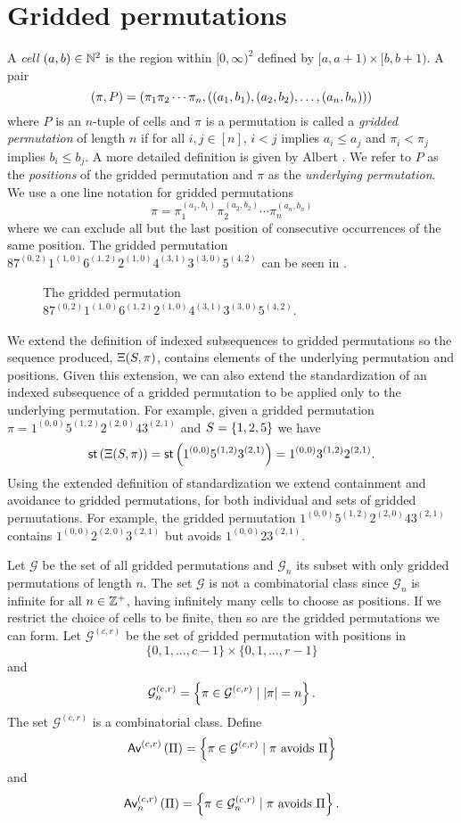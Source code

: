 \section{Gridded permutations\label{sec:griddedpermutations}}
A \emph{cell} $(a,b) \in \mathbb{N}^2$ is the region within $[0,\infty)^2$ defined by $[a, a+1) \times [b, b+1).$ A pair
\[
    (\pi,P) = (\pi_1 \pi_2 \dotsm \pi_{n}, ((a_1,b_1),(a_2,b_2),\dotsc,(a_n,b_n)))
\]
where $P$ is an $n$-tuple of cells and $\pi$ is a permutation is called a \emph{gridded permutation} of length $n$ if for all $i,j \in [n]$, $i<j$ implies $a_i \leq a_j$ and $\pi_i < \pi_j$ implies $b_i \leq b_j$. A more detailed definition is given by Albert \cite{albert2012geometric}. We refer to $P$ as the \emph{positions} of the gridded permutation and $\pi$ as the \emph{underlying permutation}. We use a one line notation for gridded permutations 
\[
    \pi = \pi_1^{(a_1,b_1)}\pi_2^{(a_2,b_2)}\dotsb\pi_n^{(a_n,b_n)}
\]
where we can exclude all but the last position of consecutive occurrences of the same position. The gridded permutation $87^{(0,2)}1^{(1,0)}6^{(1,2)}2^{(1,0)}4^{(3,1)}3^{(3,0)}5^{(4,2)}$ can be seen in .

\begin{figure}[ht!]
    \centering
    
    \caption{The gridded permutation $87^{(0,2)}1^{(1,0)}6^{(1,2)}2^{(1,0)}4^{(3,1)}3^{(3,0)}5^{(4,2)}$.}
    \label{fig:gridded_perm}
\end{figure}

We extend the definition of indexed subsequences to gridded permutations so the sequence produced, $\Xi(S,\pi)$, contains elements of the underlying permutation and positions. Given this extension, we can also extend the standardization of an indexed subsequence of a gridded permutation to be applied only to the underlying permutation. For example, given a gridded permutation $\pi = 1^{(0,0)}5^{(1,2)}2^{(2,0)}43^{(2,1)}$ and $S=\left\{1,2,5\right\}$ we have
\[
\textsf{st}\left(\Xi(S,\pi)\right) = \textsf{st}\left(1^{(0,0)}5^{(1,2)}3^{(2,1)}\right) = 1^{(0,0)}3^{(1,2)}2^{(2,1)}.
\]
Using the extended definition of standardization we extend containment and avoidance to gridded permutations, for both individual and sets of gridded permutations. For example, the gridded permutation $1^{(0,0)}5^{(1,2)}2^{(2,0)}43^{(2,1)}$ contains $1^{(0,0)}2^{(2,0)}3^{(2,1)}$ but avoids $1^{(0,0)}23^{(2,1)}$.

Let $\mathcal{G}$ be the set of all gridded permutations and $\mathcal{G}_n$ its subset with only gridded permutations of length $n$. The set $\mathcal{G}$ is not a combinatorial class since $\mathcal{G}_n$ is infinite for all $n \in \mathbb{Z}^+$, having infinitely many cells to choose as positions. If we restrict the choice of cells to be finite, then so are the gridded permutations we can form. Let $\mathcal{G}^{(c,r)}$ be the set of gridded permutation with positions in 
\[
\{0,1,\dotsc,c-1\} \times \{0,1,\dotsc,r-1\}
\]
and
\[
\mathcal{G}^{(c,r)}_n = \left\{\pi \in \mathcal{G}^{(c,r)} \mid |\pi| = n\right\}.
\]
The set $\mathcal{G}^{(c,r)}$ is a combinatorial class. Define
\[
    \textsf{Av}^{(c,r)}\left(\Pi\right) = \left\{\pi \in \mathcal{G}^{(c,r)} \mid \pi \text{ avoids } \Pi\right\}
\]
and
\[
    \textsf{Av}_n^{(c,r)}\left(\Pi\right) = \left\{\pi \in \mathcal{G}_n^{(c,r)} \mid \pi \text{ avoids } \Pi\right\}.
\]

